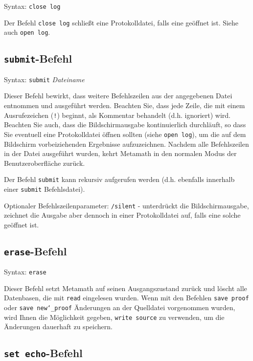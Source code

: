 Syntax:  \texttt{close log}

Der Befehl \texttt{close log} schließt eine Protokolldatei, falls eine geöffnet ist.  Siehe auch \texttt{open log}. 


\subsection{\texttt{submit}-Befehl}\label{sbmt}

Syntax:  \texttt{submit} {\em Dateiname}

Dieser Befehl bewirkt, dass weitere Befehlszeilen aus der angegebenen Datei entnommen und ausgeführt werden.  Beachten Sie, dass jede Zeile, die mit einem Ausrufezeichen (\texttt{!}) beginnt, als Kommentar behandelt (d.h. ignoriert) wird.  Beachten Sie auch, dass die Bildschirmausgabe kontinuierlich durchläuft, so dass Sie eventuell eine Protokolldatei öffnen sollten (siehe \texttt{open log}), um die auf dem Bildschirm vorbeiziehenden Ergebnisse aufzuzeichnen. Nachdem alle Befehlszeilen in der Datei ausgeführt wurden, kehrt Metamath in den normalen Modus der Benutzeroberfläche zurück. 

Der Befehl \texttt{submit} kann rekursiv aufgerufen werden (d.h. ebenfalls innerhalb einer \texttt{submit} Befehlsdatei). 

Optionaler Befehlszeilenparameter:
\texttt{/silent} - unterdrückt die Bildschirmausgabe, zeichnet die Ausgabe aber dennoch in einer Protokolldatei auf, falls eine solche geöffnet ist.  


\subsection{\texttt{erase}-Befehl}

Syntax:  \texttt{erase}

Dieser Befehl setzt Metamath auf seinen Ausgangszustand zurück und löscht alle Datenbasen, die mit \texttt{read} eingelesen wurden.  Wenn mit den Befehlen \texttt{save proof} oder \texttt{save new{\char`\_}proof} Änderungen an der Quelldatei vorgenommen wurden, wird Ihnen die Möglichkeit gegeben, \texttt{write source} zu verwenden, um die Änderungen dauerhaft zu speichern. 


\subsection{\texttt{set echo}-Befehl}


